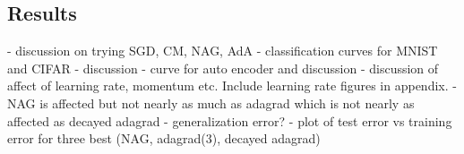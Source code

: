 \subsection{Results}

- discussion on trying SGD, CM, NAG, AdA 
- classification curves for MNIST and CIFAR
- discussion
- curve for auto encoder and discussion
- discussion of affect of learning rate, momentum etc. Include learning rate figures in appendix.
  - NAG is affected but not nearly as much as adagrad which is not nearly as affected as decayed adagrad
- generalization error?  - plot of test error vs training error for three best (NAG, adagrad(3), decayed adagrad)
